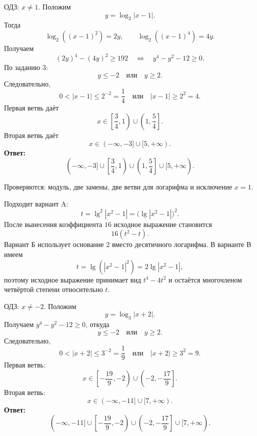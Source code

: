 \begin{teacheranswer}[Задание 5]
  ОДЗ: \(x\ne1\). Положим
  \[
    y=\log_2|x-1|.
  \]
  Тогда
  \[
    \log_2((x-1)^2)=2y,
    \qquad
    \log_2((x-1)^4)=4y.
  \]
  Получаем
  \[
    (2y)^4-(4y)^2\ge192
    \quad\Longleftrightarrow\quad
    y^4-y^2-12\ge0.
  \]
  По заданию 3:
  \[
    y\le-2\quad\text{или}\quad y\ge2.
  \]
  Следовательно,
  \[
    0<|x-1|\le2^{-2}=\frac14
    \quad\text{или}\quad
    |x-1|\ge2^2=4.
  \]
  Первая ветвь даёт
  \[
    x\in\left[\frac34,1\right)\cup\left(1,\frac54\right].
  \]
  Вторая ветвь даёт
  \[
    x\in(-\infty,-3]\cup[5,+\infty).
  \]
  \textbf{Ответ:}
  \[
    (-\infty,-3]
    \cup\left[\frac34,1\right)
    \cup\left(1,\frac54\right]
    \cup[5,+\infty).
  \]
\end{teacheranswer}

\begin{criterionbox}
  Проверяются: модуль, две замены, две ветви для логарифма и исключение \(x=1\).
\end{criterionbox}

\begin{teacheranswer}[Задание 6]
  Подходит вариант A:
  \[
    t=\lg^2|x^2-1|
    =\bigl(\lg|x^2-1|\bigr)^2.
  \]
  После вынесения коэффициента \(16\) исходное выражение становится
  \[
    16(t^2-t).
  \]
  Вариант Б использует основание \(2\) вместо десятичного логарифма.
  В варианте В имеем
  \[
    t=\lg(|x^2-1|^2)=2\lg|x^2-1|,
  \]
  поэтому исходное выражение принимает вид \(t^4-4t^2\) и остаётся
  многочленом четвёртой степени относительно \(t\).
\end{teacheranswer}

\begin{teacheranswer}[Задание 7]
  ОДЗ: \(x\ne-2\). Положим
  \[
    y=\log_3|x+2|.
  \]
  Получаем \(y^4-y^2-12\ge0\), откуда
  \[
    y\le-2\quad\text{или}\quad y\ge2.
  \]
  Следовательно,
  \[
    0<|x+2|\le3^{-2}=\frac19
    \quad\text{или}\quad
    |x+2|\ge3^2=9.
  \]
  Первая ветвь:
  \[
    x\in\left[-\frac{19}{9},-2\right)
    \cup\left(-2,-\frac{17}{9}\right].
  \]
  Вторая ветвь:
  \[
    x\in(-\infty,-11]\cup[7,+\infty).
  \]
  \textbf{Ответ:}
  \[
    (-\infty,-11]
    \cup\left[-\frac{19}{9},-2\right)
    \cup\left(-2,-\frac{17}{9}\right]
    \cup[7,+\infty).
  \]
\end{teacheranswer}

